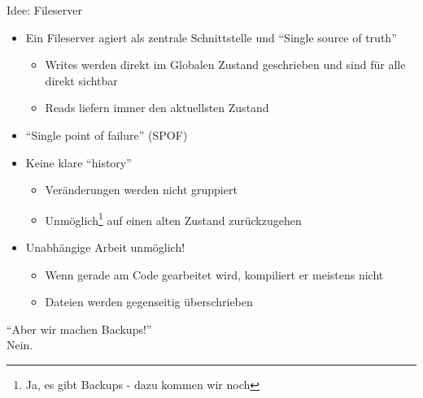 \begin{frame}
    \slidehead
    \vspace{-1em}
    Idee: Fileserver
    \begin{itemize}[<+->]
        \item Ein Fileserver agiert als zentrale Schnittstelle und \enquote{Single source of truth}
        \begin{itemize}
            \item Writes werden direkt im Globalen Zustand geschrieben und sind für alle direkt sichtbar
            \item Reads liefern immer den aktuellsten Zustand
        \end{itemize}
        \item \enquote{Single point of failure} (SPOF)
        \item Keine klare \enquote{history}
        \begin{itemize}
            \item Veränderungen werden nicht gruppiert
            \item Unmöglich\footnote{Ja, es gibt Backups - dazu kommen wir noch} auf einen alten Zustand zurückzugehen
        \end{itemize}
        \item Unabhängige Arbeit unmöglich!
        \begin{itemize}
            \item Wenn gerade am Code gearbeitet wird, kompiliert er meistens nicht
            \item Dateien werden gegenseitig überschrieben
        \end{itemize}
    \end{itemize}
\end{frame}

\begin{frame}[c]
    \slidehead
    \Large
    \centering
    \enquote{Aber wir machen Backups!}
    \pause
    \\
    \vspace{1em}
    \textcolor{red!90}{Nein.}
\end{frame}


